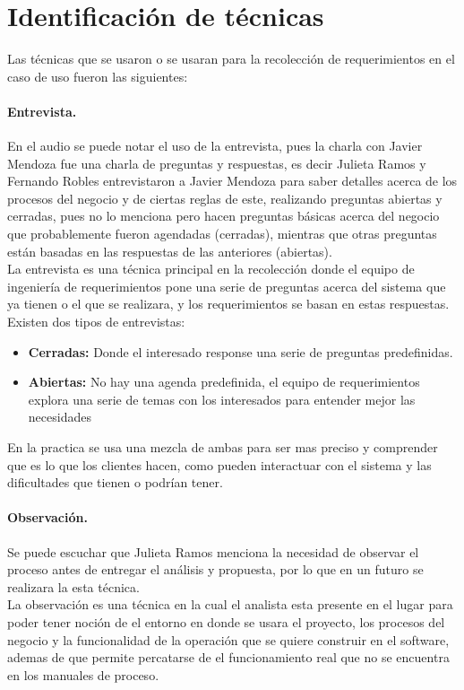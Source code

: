 \documentclass[spanish,12pt,letterpapper]{article}
\begin{document}
	\section{Identificación de técnicas}
	Las técnicas que se usaron o se usaran para la recolección de requerimientos en el caso de uso fueron las siguientes:
	
	\paragraph{Entrevista.} En el audio se puede notar el uso de la entrevista, pues la charla con Javier Mendoza fue una charla de preguntas y respuestas, es decir Julieta Ramos y Fernando Robles entrevistaron a Javier Mendoza para saber detalles acerca de los procesos del negocio y de ciertas reglas de este, realizando preguntas abiertas y cerradas, pues no lo menciona pero hacen preguntas básicas acerca del negocio que probablemente fueron agendadas (cerradas), mientras que otras preguntas están basadas en las respuestas de las anteriores (abiertas).\\
	
	La entrevista es una técnica principal en la recolección donde el equipo de ingeniería de requerimientos pone una serie de preguntas acerca del sistema que ya tienen o el que se realizara, y los requerimientos se basan en estas respuestas. Existen dos tipos de entrevistas:
	\begin{itemize}
	\item \textbf{Cerradas:} Donde el interesado response una serie de preguntas predefinidas.
	\item \textbf{Abiertas:} No hay una agenda predefinida, el equipo de requerimientos explora una serie de temas con los interesados para entender mejor las necesidades
	\end{itemize}
	En la practica se usa una mezcla de ambas para ser mas preciso y comprender que es lo que los clientes hacen, como pueden interactuar con el sistema y las dificultades que tienen o podrían tener.
	
	\paragraph{Observación.} Se puede escuchar que Julieta Ramos menciona la necesidad de observar el proceso antes de entregar el análisis y propuesta, por lo que en un futuro se realizara la esta técnica.\\
	
	La observación es una técnica en la cual el analista esta presente en el lugar para poder tener noción de el entorno en donde se usara el proyecto, los procesos del negocio y la funcionalidad de la operación que se quiere construir en el software, ademas de que permite percatarse de el funcionamiento real que no se encuentra en los manuales de proceso.
	  
\end{document}
